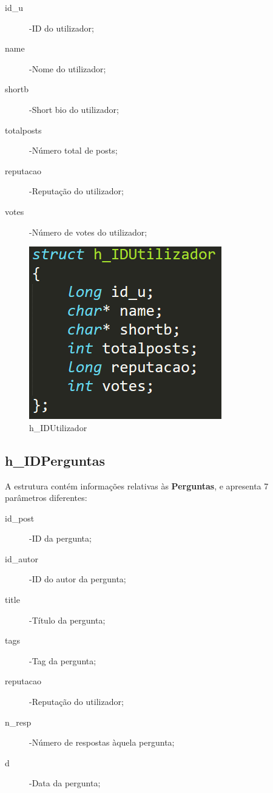 \documentclass[a4paper]{article}
\begin{document}
	\begin{description}
		\item[id_u] -ID do utilizador;
		\item[name] -Nome do utilizador;
		\item[shortb] -Short bio do utilizador;
		\item[totalposts] -Número total de posts;
		\item[reputacao] -Reputação do utilizador;
		\item[votes] -Número de votes do utilizador;
	\end{description}
	

	\begin{figure}[ht]
	\centering
	\includegraphics[scale =0.25]{utilizador.png}
	\caption{h_IDUtilizador}
	\label{img:h_IDUtilizador}
	\end{figure}

	\subsection{h_IDPerguntas}
	A estrutura contém informações relativas às \textbf{Perguntas}, e apresenta 7 parâmetros diferentes:

	\begin{description}
		\item[id_post] -ID da pergunta;
		\item[id_autor] -ID do autor da pergunta;
		\item[title] -Título da pergunta;
		\item[tags] -Tag da pergunta;
		\item[reputacao] -Reputação do utilizador;
		\item[n_resp] -Número de respostas àquela pergunta;
		\item[d] -Data da pergunta;
	\end{description}
\end{document}
